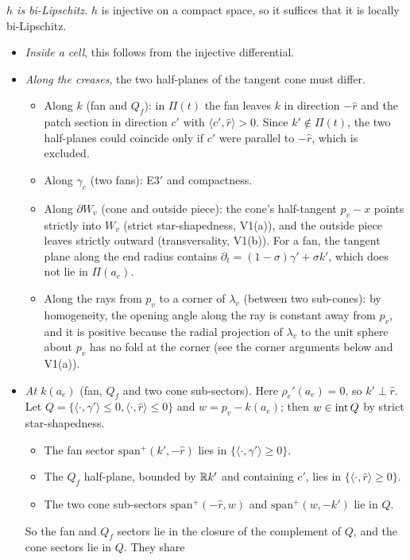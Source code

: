 \emph{$h$ is bi-Lipschitz.} $h$ is injective on a compact space, so it suffices that it is locally bi-Lipschitz.
\begin{itemize}
\item \emph{Inside a cell}, this follows from the injective differential.
\item \emph{Along the creases}, the two half-planes of the tangent cone must differ.
  \begin{itemize}
  \item Along $k$ (fan and $Q_f$): in $\Pi(t)$ the fan leaves $k$ in direction $-\hat r$ and the patch section in
  direction $c'$ with $\langle c',\hat r\rangle>0$. Since $k'\notin\Pi(t)$, the two half-planes could coincide only if
  $c'$ were parallel to $-\hat r$, which is excluded.
  \item Along $\gamma_e$ (two fans): E3$'$ and compactness.
  \item Along $\partial W_v$ (cone and outside piece): the cone's half-tangent $p_v-x$ points strictly into $W_v$ (strict
  star-shapedness, V1(a)), and the outside piece leaves strictly outward (transversality, V1(b)). For a fan, the
  tangent plane along the end radius contains $\partial_t=(1-\sigma)\gamma'+\sigma k'$, which does not lie in $\Pi(a_e)$.
  \item Along the rays from $p_v$ to a corner of $\lambda_v$ (between two sub-cones): by homogeneity, the opening angle
  along the ray is constant away from $p_v$, and it is positive because the radial projection of $\lambda_v$ to the unit
  sphere about $p_v$ has no fold at the corner (see the corner arguments below and V1(a)).
  \end{itemize}
\item \emph{At $k(a_e)$} (fan, $Q_f$ and two cone sub-sectors). Here $\rho_e'(a_e)=0$, so $k'\perp\hat r$. Let
$Q=\{\langle\cdot,\gamma'\rangle\le0,\langle\cdot,\hat r\rangle\le0\}$ and $w=p_v-k(a_e)$; then $w\in\operatorname{int} Q$ by strict
star-shapedness.
  \begin{itemize}
  \item The fan sector $\mathrm{span}^+(k',-\hat r)$ lies in $\{\langle\cdot,\gamma'\rangle\ge0\}$.
  \item The $Q_f$ half-plane, bounded by $\mathbb{R} k'$ and containing $c'$, lies in $\{\langle\cdot,\hat r\rangle\ge0\}$.
  \item The two cone sub-sectors $\mathrm{span}^+(-\hat r,w)$ and $\mathrm{span}^+(w,-k')$ lie in $Q$.
  \end{itemize}
  So the fan and $Q_f$ sectors lie in the closure of the complement of $Q$, and the cone sectors lie in $Q$. They share

\end{itemize}
